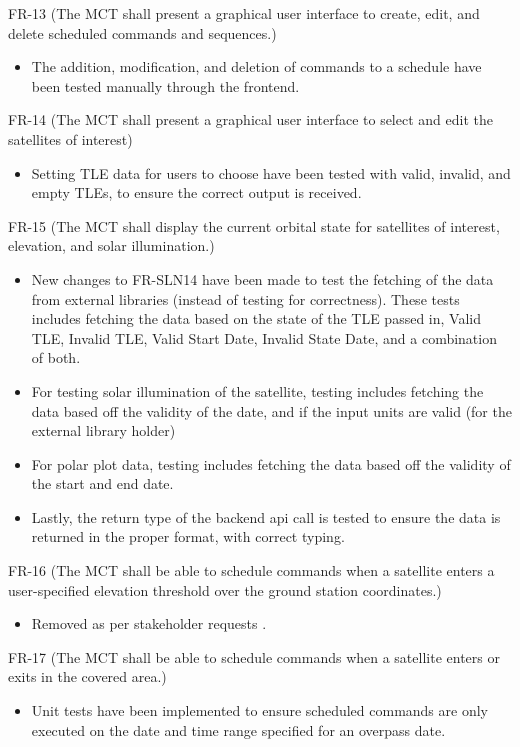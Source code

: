 \documentclass[12pt, titlepage]{article}
\begin{document}
FR-13 (The MCT shall present a graphical user interface to create, edit, and delete scheduled commands and sequences.)
\begin{itemize}    
    \item The addition, modification, and deletion of commands to a schedule have been tested manually through the frontend.
\end{itemize}



FR-14 (The MCT shall present a graphical user interface to select and edit the
satellites of interest)
\begin{itemize}
    \item Setting TLE data for users to choose have been tested with valid, invalid, and empty TLEs, to ensure the correct output is received.
\end{itemize}
FR-15 (The MCT shall display the current orbital state for satellites of interest,
elevation, and solar illumination.)

\begin{itemize}
    \item New changes to FR-SLN14 have been made to test the fetching of the data from external libraries (instead of testing for correctness). These tests includes fetching the data based on the state of the TLE passed in, Valid TLE, Invalid TLE, Valid Start Date, Invalid State Date, and a combination of both.
    \item For testing solar illumination of the satellite, testing includes fetching the data based off the validity of the date, and if the input units are valid (for the external library holder)
    \item For polar plot data, testing includes fetching the data based off the validity of the start and end date.
    \item Lastly, the return type of the backend api call is tested to ensure the data is returned in the proper format, with correct typing.
\end{itemize}

FR-16 (The MCT shall be able to schedule commands when a satellite enters a
user-specified elevation threshold over the ground station coordinates.)
\begin{itemize}
    \item Removed as per stakeholder requests .
\end{itemize}

FR-17 (The MCT shall be able to schedule commands when a satellite enters
or exits in the covered area.)
\begin{itemize}    
    \item Unit tests have been implemented to ensure scheduled commands are only executed on the date and time range specified for an overpass date.
\end{itemize}
\end{document}
